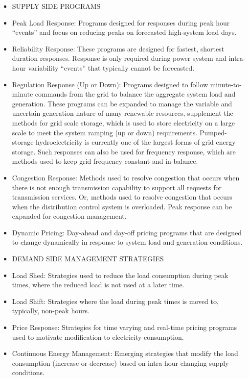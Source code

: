 \begin{itemize}
\item SUPPLY SIDE PROGRAMS
\item Peak Load Response: Programs designed for responses during peak hour “events” and focus on reducing peaks on 
forecasted high-system load days. 
\item Reliability Response: These programs are designed for fastest, shortest duration responses. 
Response is only required during power system and intra-hour variability “events” that typically cannot be forecasted.
\item Regulation Response (Up or Down): Programs designed to follow minute-to-minute commands from the grid to 
balance the aggregate system load and generation. These programs can be expanded to manage the variable and 
uncertain generation nature of many renewable resources, supplement the methods for grid scale storage, which is 
used to store electricity on a large scale to meet the system ramping (up or down) requirements. Pumped-storage 
hydroelectricity is currently one of the largest forms of grid energy storage. Such 
responses can also be used for frequency response, which are methods used to keep grid frequency constant 
and in-balance.
\item Congestion Response: Methods used to resolve congestion that occurs when there is not enough transmission 
capability to support all requests for transmission services.  Or, methods used to resolve congestion 
that occurs when the distribution control system is overloaded. Peak response can be expanded for 
congestion management.
\item Dynamic Pricing: Day-ahead and day-off pricing programs that are designed to change dynamically in response 
to system load and generation conditions.  
\item DEMAND SIDE MANAGEMENT STRATEGIES
\item Load Shed: Strategies used to reduce the load consumption during peak times, 
where the reduced load is not used at a later time.
\item Load Shift:  Strategies where the load during peak times is moved to, typically, non-peak hours.
\item Price Response:  Strategies for time varying and real-time pricing programs used to motivate modification 
to electricity consumption. 
\item Continuous Energy Management: Emerging strategies that modify the load consumption (increase or decrease) 
based on intra-hour changing supply conditions.
\end{itemize}

